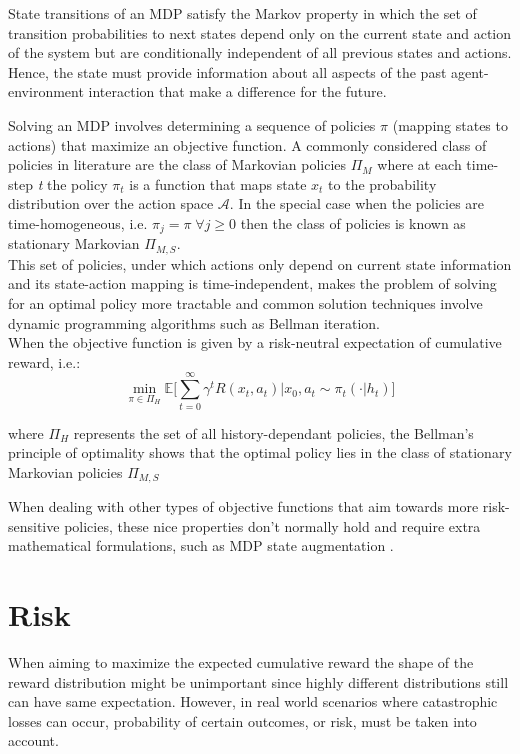 State transitions of an MDP satisfy the Markov property in which
the set of transition probabilities to next states depend only on the current state and action of the system
but are conditionally independent of all previous states and actions. Hence, the state must
provide information about all aspects of the past agent-environment interaction that
make a difference for the future.

Solving an MDP involves determining a sequence of policies $\pi$ (mapping states to actions)
that maximize an objective function.
A commonly considered class of policies in literature are the class of Markovian policies $\Pi_M$ where
at each time-step \textit{t} the policy $\pi_t$ is a function that maps state $x_t$ to 
the probability distribution over the action space $\mathcal{A}$. 
In the special case when the policies are time-homogeneous, i.e. $\pi_j = \pi \; \forall j \geq 0$ then the
class of policies is known as stationary Markovian $\Pi_{M,S}$.\\
This set of policies, under which actions only depend on current state information and
its state-action mapping is time-independent, makes the problem of solving for an optimal policy more
tractable and common solution techniques involve dynamic programming algorithms \citep{Bertsekas1995}
such as Bellman iteration.\\
When the objective function is given by a risk-neutral expectation of cumulative reward,
i.e.:
\begin{equation}
    \underset{\pi \in \Pi_H}{\min} \mathbb E  \big [  \sum_{t=0}^{\infty} \gamma^t R(x_t,a_t) | x_0, a_t \sim \pi_t(\cdot |h_t)  \big]
\end{equation} 

where $ \Pi_H$ represents the set of all history-dependant policies,
the Bellman's principle of optimality \citep{Bertsekas1995} shows that the optimal
policy lies in the class of stationary Markovian policies $\Pi_{M,S}$

When dealing with other types of objective functions that aim towards more risk-sensitive
policies, these nice properties don't normally hold
and require extra mathematical formulations, such as MDP state augmentation \citep{Chow2015}.



\section{Risk}
When aiming to maximize the expected cumulative reward the shape of the reward distribution might be unimportant
since highly different distributions still can have same expectation.
However, in real world scenarios where catastrophic losses can occur, probability of certain outcomes, or risk, must be taken into account.

